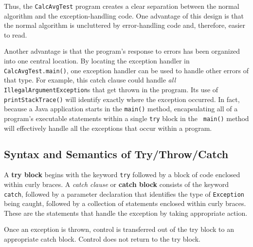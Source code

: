 Thus, the {\tt CalcAvgTest} program creates a clear separation between
the normal algorithm and the exception-handling code.  One advantage
of this design is that the normal algorithm is uncluttered by
error-handling code and, therefore, easier to read.

Another advantage is that the program's response to errors has been
organized into one central location.  By locating the exception
handler in {\tt Calc\-AvgTest.main()}, one exception handler can be used
to handle other errors of that type.  For example, this catch clause
could handle {\it all} {\tt IllegalArgumentException}s that get thrown in
the program.  Its use of {\tt printStackTrace()} will identify exactly
where the exception occurred. In fact, because a Java application
starts in the {\tt main()} method, encapsulating all of a program's
executable statements within a single {\tt try} block in the {\tt
main()} method will effectively handle all the exceptions that occur
within a program.


\subsection{Syntax and Semantics of Try/Throw/Catch}
\noindent A {\bf try block} begins with the keyword {\tt try} followed by a block
of code enclosed within curly braces.  A {\it catch clause} or {\bf
catch block} consists of the keyword {\tt catch}, followed by a
parameter declaration that identifies the type
of {\tt Exception} being caught, followed by a collection of
statements enclosed within curly braces.  These are the statements that
handle the exception by taking appropriate action.

Once an exception is thrown, control is transferred out of the try
block to an appropriate catch block.  Control does not return to the
try block.



